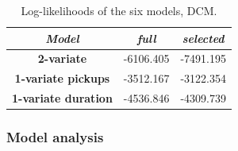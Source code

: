 \begin{table}
	\centering
	\renewcommand\arraystretch{1.3}
	\begin{tabular}{c|c|c}
		\hline
		\textit{Model} &\textit{full } & \textit{selected} \\ 
		\hline
		\textbf{2-variate } & -6106.405  & -7491.195    \\ 
		\hline
		\textbf{1-variate pickups } & -3512.167  & -3122.354    \\ 
		\hline
		\textbf{1-variate duration} & -4536.846  & -4309.739   \\ 
		\hline
	\end{tabular}
	\caption[Log-likelihoods of the six models (DCM)]{Log-likelihoods of the six models, DCM.}
	\label{Log-likelihoods DCM}
\end{table}

\subsubsection{Model analysis}

